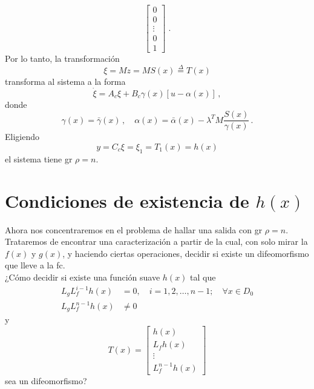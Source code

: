 {\begin{equation*}
\begin{bmatrix}
			0      \\
			0      \\
			\vdots \\
			0      \\
			1
		\end{bmatrix} \; .
	\end{equation*}
	Por lo tanto, la transformación
	\begin{equation*}
		\xi = Mz = MS(x) \overset{\Delta}{=} T(x)
	\end{equation*}
	transforma al sistema a la forma
	\begin{equation*}
		\dot{\xi} = A_c \xi + B_c \gamma(x)[u - \alpha(x)] \, ,
	\end{equation*}
	donde
	\begin{equation*}
		\gamma(x) = \bar{\gamma}(x) \, , \quad \alpha(x) = \bar{\alpha}(x) - \lambda^T M \dfrac{S(x)}{\gamma(x)} \, .
	\end{equation*}
	Eligiendo
	\begin{equation*}
		y = C_c \xi = \xi_1 = T_1(x) = h(x)
	\end{equation*}
	el sistema tiene \gls{gr} $\rho = n$.
}

\section{Condiciones de existencia de $h(x)$}
Ahora nos concentraremos en el problema de hallar una salida con \gls{gr} $\rho = n$.\\

Trataremos de encontrar una caracterización a partir de la cual, con solo mirar la $f(x)$ y $g(x)$, y haciendo ciertas operaciones, decidir si existe un difeomorfismo que lleve a la \gls{fc}.\\

¿Cómo decidir si existe una función suave $h(x)$ tal que
\begin{equation}
	\begin{aligned}
		L_g L_f^{i-1} h(x) & = 0, \quad i = 1, 2, \ldots, n-1; \quad \forall x \in D_0 \\
		L_g L_f^{n-1} h(x) & \neq 0
	\end{aligned}
	\label{eq:edp_h}
\end{equation}
y
\begin{equation*}
	T(x) = \begin{bmatrix}
		h(x)     \\
		L_f h(x) \\
		\vdots   \\
		L_f^{n-1} h(x)
	\end{bmatrix}
\end{equation*}
sea un difeomorfismo?\\


